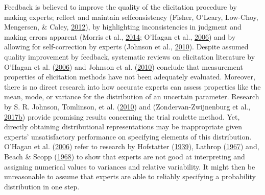 \documentclass[openright,titlepage,12pt,a4paper]{book}
\begin{document}
Feedback is believed to improve the quality of the elicitation procedure by making experts; reflect and maintain selfconsistency (Fisher, O'Leary, Low-Choy, Mengersen, \& Caley, \protect\hyperlink{ref-fisher_software_2012}{2012}), by highlighting inconsistencies in judgment and making errors apparent (Morris et al., \protect\hyperlink{ref-morris_web-based_2014}{2014}; O'Hagan et al., \protect\hyperlink{ref-ohagan_uncertain_2006}{2006}) and by allowing for self-correction by experts (Johnson et al., \protect\hyperlink{ref-johnson_methods_2010}{2010}). Despite assumed quality improvement by feedback, systematic reviews on elicitation literature by O'Hagan et al. (\protect\hyperlink{ref-ohagan_uncertain_2006}{2006}) and Johnson et al. (\protect\hyperlink{ref-johnson_methods_2010}{2010}) conclude that measurement properties of elicitation methods have not been adequately evaluated. Moreover, there is no direct research into how accurate experts can assess properties like the mean, mode, or variance for the distribution of an uncertain parameter. Research by S. R. Johnson, Tomlinson, et al. (\protect\hyperlink{ref-johnson_valid_2010}{2010}) and (Zondervan-Zwijnenburg et al., \protect\hyperlink{ref-zondervan-zwijnenburg_application_2017}{2017}\protect\hyperlink{ref-zondervan-zwijnenburg_application_2017}{b}) provide promising results concerning the trial roulette method. Yet, directly obtaining distributional representations may be inappropriate given experts' unsatisfactory performance on specifying elements of this distribution. O'Hagan et al. (\protect\hyperlink{ref-ohagan_uncertain_2006}{2006}) refer to research by Hofstatter (\protect\hyperlink{ref-hofstatter_uber_1939}{1939}), Lathrop (\protect\hyperlink{ref-lathrop_perceived_1967}{1967}) and, Beach \& Scopp (\protect\hyperlink{ref-beach_intuitive_1968}{1968}) to show that experts are not good at interpreting and assigning numerical values to variances and relative variability. It might then be unreasonable to assume that experts are able to reliably specifying a probability distribution in one step.
\end{document}
